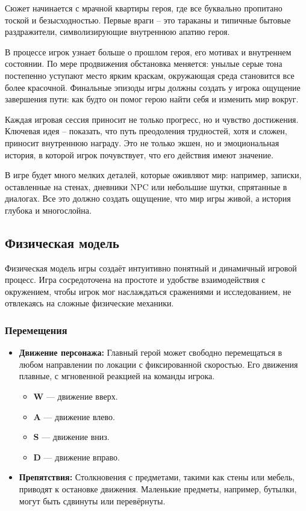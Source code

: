 \documentclass[12pt]{article}
\begin{document}
        Сюжет начинается с мрачной квартиры героя, где все буквально пропитано тоской и безысходностью. Первые враги – это тараканы и типичные бытовые раздражители, символизирующие внутреннюю апатию героя. 
    
        В процессе игрок узнает больше о прошлом героя, его мотивах и внутреннем состоянии. По мере продвижения обстановка меняется: унылые серые тона постепенно уступают место ярким краскам, окружающая среда становится все более красочной. Финальные эпизоды игры должны создать у игрока ощущение завершения пути: как будто он помог герою найти себя и изменить мир вокруг.  
    
        Каждая игровая сессия приносит не только прогресс, но и чувство достижения. Ключевая идея – показать, что путь преодоления трудностей, хотя и сложен, приносит внутреннюю награду. Это не только экшен, но и эмоциональная история, в которой игрок почувствует, что его действия имеют значение.  
    
        В игре будет много мелких деталей, которые оживляют мир: например, записки, оставленные на стенах, дневники NPC или небольшие шутки, спрятанные в диалогах. Все это должно создать ощущение, что мир игры живой, а история глубока и многослойна.
    \subsection{Физическая модель}

        Физическая модель игры создаёт интуитивно понятный и динамичный игровой процесс. Игра сосредоточена на простоте и удобстве взаимодействия с окружением, чтобы игрок мог наслаждаться сражениями и исследованием, не отвлекаясь на сложные физические механики.
        
        \subsubsection{Перемещения}
        
        \begin{itemize}
            \item \textbf{Движение персонажа:} Главный герой может свободно перемещаться в любом направлении по локации с фиксированной скоростью. Его движения плавные, с мгновенной реакцией на команды игрока.
            \begin{itemize}
                \item \textbf{W} — движение вверх.
                \item \textbf{A} — движение влево.
                \item \textbf{S} — движение вниз.
                \item \textbf{D} — движение вправо.
            \end{itemize}
            \item \textbf{Препятствия:} Столкновения с предметами, такими как стены или мебель, приводят к остановке движения. Маленькие предметы, например, бутылки, могут быть сдвинуты или перевёрнуты.
        \end{itemize}
        
\end{document}

